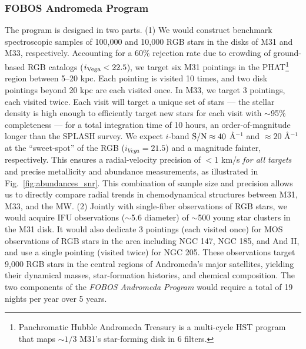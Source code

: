 \documentclass[11pt,a4paper,twoside,onecolumn,openany,final,oldfontcommands]{memoir}
\begin{document}



\subsubsection{FOBOS Andromeda Program} The program is designed in two parts. (1) We would construct benchmark spectroscopic samples of 100,000 and 10,000 RGB stars in the disks of M31 and M33, respectively.  Accounting for a 60\% rejection rate \citep{dorman12} due to crowding of ground-based RGB catalogs ($i_{\rm Vega} < 22.5$), we target six M31 pointings in the PHAT\footnote{Panchromatic Hubble Andromeda Treasury \citep{phat} is a multi-cycle HST program that maps $\sim1/3$ M31's star-forming disk in 6 filters.} region between 5--20 kpc.  Each pointing is visited 10 times, and two disk pointings beyond 20 kpc are each visited once.  In M33, we target 3 pointings, each visited twice.  Each visit will target a unique set of stars --- the stellar density is high enough to efficiently target new stars for each visit with $\sim$95\% completeness --- for a total integration time of 10 hours, an order-of-magnitude longer than the SPLASH survey.  We expect $i$-band ${\rm S/N} \approx 40$ \AA$^{-1}$ and $\approx 20$ \AA$^{-1}$ at the  ``sweet-spot'' of the RGB ($i_{Vega} = 21.5$) and a magnitude fainter, respectively.  This ensures a radial-velocity precision of $<$1 km/s {\it for all targets} and precise metallicity and abundance measurements, as illustrated in Fig.~\ref{fig:abundances_snr}.
This combination of sample size and precision allows us to directly compare radial trends in chemodynamical structures between M31, M33, and the MW. (2) Jointly with single-fiber observations of RGB stars, we would acquire IFU observations ($\sim$5.6\arcsec{} diameter) of $\sim$500 young star clusters in the M31 disk.  It would also dedicate 3 pointings (each visited once) for MOS observations of RGB stars in the area including NGC 147, NGC 185, and And II, and use a single pointing (visited twice) for NGC 205.  These observations target 9,000 RGB stars in the central regions of Andromeda's major satellites, yielding their dynamical masses, star-formation histories, and chemical composition.  The two components of the {\it FOBOS Andromeda Program} would require a total of 19 nights per year over 5 years. 
\end{document}
